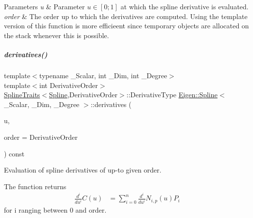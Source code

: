 \begin{DoxyParams}{Parameters}
{\em u} & Parameter $u \in [0;1]$ at which the spline derivative is evaluated. \\
\hline
{\em order} & The order up to which the derivatives are computed. Using the template version of this function is more efficieent since temporary objects are allocated on the stack whenever this is possible. \\
\hline
\end{DoxyParams}
\mbox{\label{group___splines___module_a50bcf6c99a95ecab7c475f3ab503ee22}} 
\subparagraph{\texorpdfstring{derivatives()}{derivatives()}\hspace{0.1cm}{\footnotesize\ttfamily [4/4]}}
{\footnotesize\ttfamily template$<$typename \+\_\+\+Scalar, int \+\_\+\+Dim, int \+\_\+\+Degree$>$ \\
template$<$int Derivative\+Order$>$ \\
\hyperlink{struct_eigen_1_1_spline_traits}{Spline\+Traits}$<$\hyperlink{group___splines___module_class_eigen_1_1_spline}{Spline},Derivative\+Order$>$\+::Derivative\+Type \hyperlink{group___splines___module_class_eigen_1_1_spline}{Eigen\+::\+Spline}$<$ \+\_\+\+Scalar, \+\_\+\+Dim, \+\_\+\+Degree $>$\+::derivatives (\begin{DoxyParamCaption}\item[{\hyperlink{group___splines___module_a8cafd78b564825c76fbb3419653d9742}{Scalar}}]{u,  }\item[{Dense\+Index}]{order = {\ttfamily DerivativeOrder} }\end{DoxyParamCaption}) const}



Evaluation of spline derivatives of up-\/to given order. 

The function returns \begin{align*} \frac{d^i}{du^i}C(u) & = \sum_{i=0}^{n} \frac{d^i}{du^i} N_{i,p}(u)P_i \end{align*} for i ranging between 0 and order.


